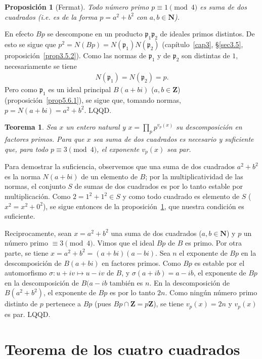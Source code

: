 \documentclass[bibtotoc,leqno,spanish]{amsbook}
\newcommand{\ZZ}{\mathbf{Z}}
\newcommand{\NN}{\mathbf{N}}
\newcommand{\idl}[1]{\mathfrak{#1}}
\newcommand{\QED}{LQQD.}
\numberwithin{equation}{section}
\theoremstyle{note}
\theoremstyle{note}
\newtheorem{theorem}{Teorema}
\newtheorem{proposition}{Proposici\'on}
\theoremstyle{rem}
\numberwithin{theorem}{section}
\numberwithin{proposition}{section}
\numberwithin{definition}{section}
\numberwithin{lemma}{section}
\numberwithin{corollary}{section}
\numberwithin{example}{section}
\numberwithin{footnote}{section}%
\begin{document}
\begin{proposition}[Fermat]\label{prop5.6.2}
Todo n\'umero primo $p\equiv 1\pmod 4$ es suma de dos cuadrados (i.e. es de la forma $p=a^{2}+b^{2}$ con
$a,b\in\NN$).
\end{proposition}

En efecto $Bp$ se descompone en un producto $\idl{p}_{1}\idl{p}_{2}$ de ideales primos distintos.
De esto se sigue que $p^{2}=N(Bp) = N(\idl{p}_{1})N(\idl{p}_{2})$ (cap\'itulo~\ref{cap3}, \S\ref{sec3.5},
proposici\'on~\ref{prop3.5.2}).
Como las normas de $\idl{p}_{1}$ y de $\idl{p}_{2}$ son distintas de $1$, necesariamente se tiene
\begin{gather*}
N(\idl{p}_{1}) = N(\idl{p}_{2}) = p.
\end{gather*}
Pero como $\idl{p}_{1}$ es un ideal principal $B(a+bi)$ ($a,b\in\ZZ$)
(proposici\'on~\ref{prop5.6.1}), se sigue que, tomando
normas, $p = N(a+bi)=a^{2}+b^{2}$. \QED

\begin{theorem}
Sea $x$ un entero natural y $x = \prod_{p}p^{v_{p}(x)}$ su descomposici\'on en factores primos. Para que $x$
sea suma de dos cuadrados es necesario y suficiente que, para todo $p\equiv 3\pmod 4$, el exponente
$v_{p}(x)$ sea par.
\end{theorem}

Para demostrar la suficiencia, observemos que una suma de dos cuadrados $a^{2}+b^{2}$ es la norma
$N(a+bi)$ de un elemento de $B$; por la multiplicatividad de las normas, el conjunto $S$ de sumas de dos
cuadrados es por lo tanto estable por multiplicaci\'on. Como $2 = 1^{2}+1^{2}\in S$ y como todo cuadrado
es elemento de $S$ ($x^{2}=x^{2}+0^{2}$), se sigue entonces de la
proposici\'on~\ref{prop5.6.2}, que nuestra condici\'on es suficiente.

Reciprocamente, sean $x=a^{2}+b^{2}$ una suma de dos cuadrados ($a,b\in\NN$) y $p$ un n\'umero primo
$\equiv 3\pmod 4$. Vimos que el ideal $Bp$ de $B$ es primo. Por otra parte, se tiene
$x = a^{2}+b^{2}=(a+bi)(a-bi)$. Sea $n$ el exponente de $Bp$ en la descomposici\'on de $B(a+bi)$ en factores
primos. Como $Bp$ es estable por el automorfismo $\sigma:u+iv\mapsto u-iv$ de $B$, y $\sigma(a+ib)=a-ib$,
el exponente de $Bp$ en la descomposici\'on de $B(a-ib$ tambi\'en es $n$. En la descomposici\'on de
$B(a^{2}+b^{2})$, el exponente de $Bp$ es por lo tanto $2n$. Como ning\'un n\'umero primo distinto de
$p$ pertenece a $Bp$ (pues $Bp\cap\ZZ = p\ZZ$), se tiene $v_{p}(x) = 2n$ y $v_{p}(x)$ es par. \QED

\section{Teorema de los cuatro cuadrados}\label{sec5.7}
\end{document}
